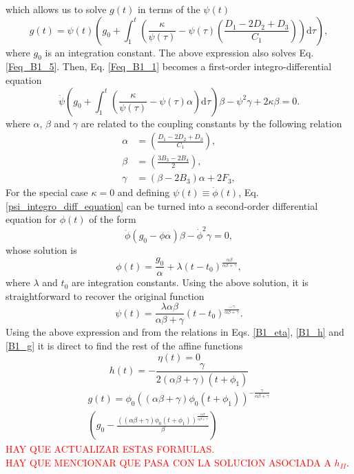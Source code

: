 which allows us to solve $g(t)$ in terms of the $\psi(t)$ 
\begin{equation}
    \label{B1_g}
    g(t) = \psi(t) \left(g_0 + \int_1^t \left(\frac{\kappa}{\psi(\tau)} - \psi(\tau) \left(\frac{D_1 - 2D_2 + D_3}{C_1}\right)\right) \mathrm{d}\tau\right),
\end{equation}
where $g_0$ is an integration constant. The above expression also solves Eq. \eqref{Feq_B1_5}. Then, Eq. \eqref{Feq_B1_1} becomes a first-order integro-differential equation 
\begin{dmath}
    \label{psi_integro_diff_equation}
    \dot{\psi}\left(g_0 + \int_1^t \left(\frac{\kappa}{\psi(\tau)} - \psi(\tau) \alpha\right) \mathrm{d}\tau\right)\beta -
    \psi^2 \gamma + 2\kappa\beta = 0.
\end{dmath}
where $\alpha$, $\beta$ and $\gamma$ are related to the coupling constants
by the following relation
\begin{align}
    \alpha & = \left(\frac{D_1 - 2D_2 + D_3}{C_1}\right), \\
    \beta & = \left(\frac{3B_3 - 2B_4}{2}\right), \\
    \gamma & = \left(\beta - 2B_3\right)\alpha + 2F_3,
\end{align}
For the special case $\kappa = 0$ and defining $\psi (t) \equiv \dot{\phi}(t)$, Eq.\eqref{psi_integro_diff_equation} can be turned into a second-order differential equation for $\phi(t)$ of the form
\begin{dmath}
    \ddot{\phi}\left(g_0  - \phi\alpha\right)\beta - \dot{\phi}^2 \gamma  = 0,
\end{dmath}
whose solution is
\begin{equation}
    \phi(t) =\frac{g_0}{\alpha} + \lambda\left(t -t_0\right)^{\frac{\alpha\beta}{\alpha\beta + \gamma}},
\end{equation}
where $\lambda $ and $t_0$ are integration constants. Using the above solution, it is straightforward to recover the original function
\begin{equation}
    \psi(t) =\frac{ \lambda\alpha\beta}{\alpha\beta + \gamma}\left(t -t_0\right)^{\frac{-\gamma}{\alpha\beta + \gamma}}.
\end{equation}
Using the above expression and from the relations in Eqs. \eqref{B1_eta}, \eqref{B1_h} and \eqref{B1_g} it is direct to find the rest of the
affine functions
\begin{dmath}
\eta(t)  = 0
\end{dmath}
\begin{dmath}
h(t) = - \frac{\gamma}{2\left(\alpha\beta + \gamma\right)\left(t + \phi_1\right)}
\end{dmath}
\begin{multline}
g(t)  = \phi_0 \left(\left(\alpha\beta + \gamma\right)\phi_0 \left(t + \phi_1\right)\right)^{-\frac{\gamma}{\alpha\beta + \gamma}} \\
\left(g_0 - \frac{\left(\left(\alpha\beta + \gamma\right)\phi_0\left(t + \phi_1\right)\right)^{\frac{\alpha\beta}{\alpha\beta + \gamma}}}{\beta}\right)
\end{multline}
\textcolor{red}{HAY QUE ACTUALIZAR ESTAS FORMULAS. \\ HAY QUE MENCIONAR QUE PASA CON LA SOLUCION ASOCIADA A $h_{II}$}.

